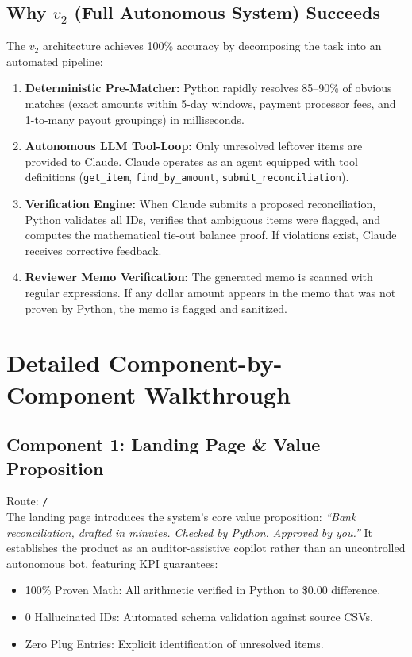 \documentclass[10pt,a4paper]{article}
\begin{document}
\subsection{Why $v_2$ (Full Autonomous System) Succeeds}
The $v_2$ architecture achieves 100\% accuracy by decomposing the task into an automated pipeline:
\begin{enumerate}
    \item \textbf{Deterministic Pre-Matcher:} Python rapidly resolves 85--90\% of obvious matches (exact amounts within 5-day windows, payment processor fees, and 1-to-many payout groupings) in milliseconds.
    \item \textbf{Autonomous LLM Tool-Loop:} Only unresolved leftover items are provided to Claude. Claude operates as an agent equipped with tool definitions (\texttt{get\_item}, \texttt{find\_by\_amount}, \texttt{submit\_reconciliation}).
    \item \textbf{Verification Engine:} When Claude submits a proposed reconciliation, Python validates all IDs, verifies that ambiguous items were flagged, and computes the mathematical tie-out balance proof. If violations exist, Claude receives corrective feedback.
    \item \textbf{Reviewer Memo Verification:} The generated memo is scanned with regular expressions. If any dollar amount appears in the memo that was not proven by Python, the memo is flagged and sanitized.
\end{enumerate}

\section{Detailed Component-by-Component Walkthrough}

\subsection{Component 1: Landing Page \& Value Proposition}
Route: \texttt{/} \\
The landing page introduces the system's core value proposition: \emph{``Bank reconciliation, drafted in minutes. Checked by Python. Approved by you.''} It establishes the product as an auditor-assistive copilot rather than an uncontrolled autonomous bot, featuring KPI guarantees:
\begin{itemize}[noitemsep]
    \item 100\% Proven Math: All arithmetic verified in Python to \$0.00 difference.
    \item 0 Hallucinated IDs: Automated schema validation against source CSVs.
    \item Zero Plug Entries: Explicit identification of unresolved items.
\end{itemize}
\end{document}
